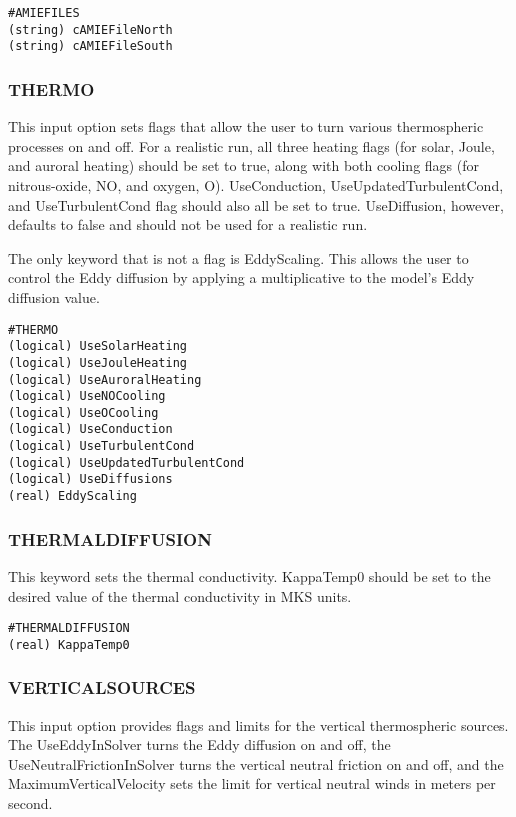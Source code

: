 \begin{verbatim}
#AMIEFILES
(string) cAMIEFileNorth 
(string) cAMIEFileSouth
\end{verbatim}

\subsubsection{THERMO}
\label{thermo.sec}

This input option sets flags that allow the user to turn various thermospheric processes on and off.  For a realistic run, all three heating flags (for solar, Joule, and auroral heating) should be set to true, along with both cooling flags (for nitrous-oxide, NO, and oxygen, O).  UseConduction, UseUpdatedTurbulentCond, and UseTurbulentCond flag should also all be set to true.  UseDiffusion, however, defaults to false and should not be used for a realistic run.

The only keyword that is not a flag is EddyScaling.  This allows the user to control the Eddy diffusion by applying a multiplicative to the model's Eddy diffusion value.

\begin{verbatim}
#THERMO
(logical) UseSolarHeating   
(logical) UseJouleHeating   
(logical) UseAuroralHeating
(logical) UseNOCooling    
(logical) UseOCooling       
(logical) UseConduction     
(logical) UseTurbulentCond  
(logical) UseUpdatedTurbulentCond
(logical) UseDiffusions
(real) EddyScaling  
\end{verbatim}

\subsubsection{THERMALDIFFUSION}
\label{thermaldiffusion.sec}

This keyword sets the thermal conductivity.  KappaTemp0 should be set to the desired value of the thermal conductivity in MKS units.

\begin{verbatim}
#THERMALDIFFUSION
(real) KappaTemp0
\end{verbatim}

\subsubsection{VERTICALSOURCES}
\label{verticalsources.sec}

This input option provides flags and limits for the vertical thermospheric sources.  The UseEddyInSolver turns the Eddy diffusion on and off, the UseNeutralFrictionInSolver turns the vertical neutral friction on and off, and the MaximumVerticalVelocity sets the limit for vertical neutral winds in meters per second.

